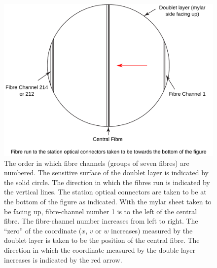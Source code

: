 \begin{figure}
  \begin{center}
    \includegraphics[width=0.85\linewidth]{detectors/tracker/02-Definitions/Figures/fibre-channel-numbering.pdf}
  \end{center}
  \caption{The order in which fibre channels (groups of seven fibres) are numbered. The sensitive surface of the doublet layer is indicated by the solid circle. The direction in which the fibres run is indicated by the vertical lines. The station optical connectors are taken to be at the bottom of the figure as indicated. With the mylar sheet taken to be facing up, fibre-channel number 1 is to the left of the central fibre. The fibre-channel number increases from left to right. The ``zero'' of the coordinate ($x$, $v$ or $w$ increases) measured by the doublet layer is taken to be the position of the central fibre. The direction in which the coordinate measured by the double layer increases is indicated by the red arrow.}
  \label{Fig:FbrChnlNmbrng}
\end{figure}
